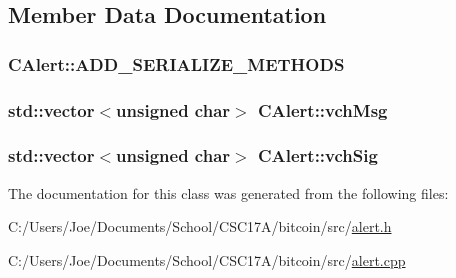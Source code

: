 \subsection{Member Data Documentation}
\hypertarget{class_c_alert_aca9310112e67fb38ef88f385a4ac6fc0}{}
\subsubsection[{A\+D\+D\+\_\+\+S\+E\+R\+I\+A\+L\+I\+Z\+E\+\_\+\+M\+E\+T\+H\+O\+D\+S}]{\setlength{\rightskip}{0pt plus 5cm}C\+Alert\+::\+A\+D\+D\+\_\+\+S\+E\+R\+I\+A\+L\+I\+Z\+E\+\_\+\+M\+E\+T\+H\+O\+D\+S}\label{class_c_alert_aca9310112e67fb38ef88f385a4ac6fc0}
\hypertarget{class_c_alert_abfcb3b339d052cd3dd6670b03286758a}{}
\subsubsection[{vch\+Msg}]{\setlength{\rightskip}{0pt plus 5cm}std\+::vector$<$unsigned char$>$ C\+Alert\+::vch\+Msg}\label{class_c_alert_abfcb3b339d052cd3dd6670b03286758a}
\hypertarget{class_c_alert_a541b49670ebf387a5f8b7de59277fed0}{}
\subsubsection[{vch\+Sig}]{\setlength{\rightskip}{0pt plus 5cm}std\+::vector$<$unsigned char$>$ C\+Alert\+::vch\+Sig}\label{class_c_alert_a541b49670ebf387a5f8b7de59277fed0}


The documentation for this class was generated from the following files\+:\begin{DoxyCompactItemize}
\item 
C\+:/\+Users/\+Joe/\+Documents/\+School/\+C\+S\+C17\+A/bitcoin/src/\hyperlink{alert_8h}{alert.\+h}\item 
C\+:/\+Users/\+Joe/\+Documents/\+School/\+C\+S\+C17\+A/bitcoin/src/\hyperlink{alert_8cpp}{alert.\+cpp}\end{DoxyCompactItemize}
